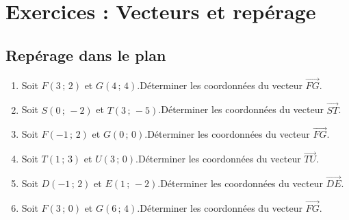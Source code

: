 \section*{Exercices : Vecteurs et repérage}
{\setlength{\columnseprule}{0pt}
\setcounter{NumEx}{1}



\subsection*{Repérage dans le plan}


\begin{Exercice}%
\leavevmode\vspace{-\baselineskip}
\begin{enumerate}[itemsep=1em]
	\item \begin{minipage}[t]{\linewidth}Soit $F\left(3\,;\,2\right)$ et $G\left(4\,;\,4\right)$.Déterminer les coordonnées du vecteur $\overrightarrow{FG}$.\end{minipage}
	\item \begin{minipage}[t]{\linewidth}Soit $S\left(0\,;\,-2\right)$ et $T\left(3\,;\,-5\right)$.Déterminer les coordonnées du vecteur $\overrightarrow{ST}$.\end{minipage}
	\item \begin{minipage}[t]{\linewidth}Soit $F\left(-1\,;\,2\right)$ et $G\left(0\,;\,0\right)$.Déterminer les coordonnées du vecteur $\overrightarrow{FG}$.\end{minipage}
	\item \begin{minipage}[t]{\linewidth}Soit $T\left(1\,;\,3\right)$ et $U\left(3\,;\,0\right)$.Déterminer les coordonnées du vecteur $\overrightarrow{TU}$.\end{minipage}
	\item \begin{minipage}[t]{\linewidth}Soit $D\left(-1\,;\,2\right)$ et $E\left(1\,;\,-2\right)$.Déterminer les coordonnées du vecteur $\overrightarrow{DE}$.\end{minipage}
	\item \begin{minipage}[t]{\linewidth}Soit $F\left(3\,;\,0\right)$ et $G\left(6\,;\,4\right)$.Déterminer les coordonnées du vecteur $\overrightarrow{FG}$.\end{minipage}

\end{enumerate}
\end{Exercice}}
